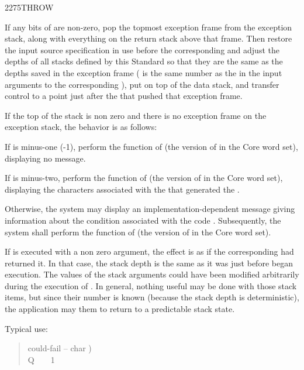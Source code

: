 \begin{worddef}{2275}{THROW}
\item {}

	If any bits of  are non-zero, pop the topmost exception
	frame from the exception stack, along with everything on the
	return stack above that frame. Then restore the input source
	specification in use before the corresponding 
	and adjust the depths of all stacks defined by this Standard
	so that they are the same as the depths saved in the exception
	frame ( is the same number as the  in the input
	arguments to the corresponding ), put  on
	top of the data stack, and transfer control to a point just after
	the  that pushed that exception frame.

	If the top of the stack is non zero and there is no exception
	frame on the exception stack, the behavior is as follows:

	If  is minus-one (-1), perform the function of
	 (the version of  in
	the Core word set), displaying no message.

	If  is minus-two, perform the function of
	 (the version of 
	in the Core word set), displaying the characters 
	associated with the  that generated the
	.

	Otherwise, the system may display an implementation-dependent
	message giving information about the condition associated with
	the  code . Subsequently, the system shall
	perform the function of  (the version
	of  in the Core word set).

\begin{defer}
\rationale %
	If  is executed with a non zero argument, the effect
	is as if the corresponding  had returned it. In that
	case, the stack depth is the same as it was just before 
	began execution. The values of the  stack arguments could
	have been modified arbitrarily during the execution of .
	In general, nothing useful may be done with those stack items, but
	since their number is known (because the stack depth is deterministic),
	the application may  them to return to a predictable
	stack state.

	Typical use:
	\begin{quote}\ttfamily
		\word{:} could-fail  -- char ) \\
		\tab {}  \word{[CHAR]} Q \word{=}~
			~ 1 
		\word{;}


\end{quote}
\end{defer}
\end{worddef}
